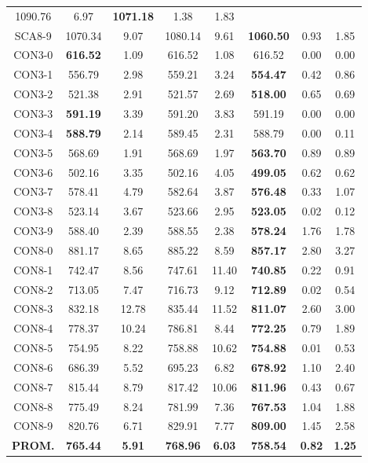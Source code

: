 \begin{table}[h]
\begin{tabular}{c c c c c c c c}
1090.76 & 6.97 & \bf{1071.18} & 
1.38 & 1.83\\SCA8-9 & 1070.34 & 9.07 & 
1080.14 & 9.61 & \bf{1060.50} & 
0.93 & 1.85\\CON3-0 & \bf{616.52} & 1.09 & 
616.52 & 1.08 & 616.52 & 0.00
 & 0.00\\
CON3-1 & 556.79 & 2.98 & 
559.21 & 3.24 & \bf{554.47} & 
0.42 & 0.86\\CON3-2 & 521.38 & 2.91 & 
521.57 & 2.69 & \bf{518.00} & 
0.65 & 0.69\\CON3-3 & \bf{591.19} & 3.39 & 
591.20 & 3.83 & 591.19 & 0.00
 & 0.00\\CON3-4 & \bf{588.79} & 2.14 & 
589.45 & 2.31 & 588.79 & 0.00
 & 0.11\\CON3-5 & 568.69 & 1.91 & 
568.69 & 1.97 & \bf{563.70} & 
0.89 & 0.89\\CON3-6 & 502.16 & 3.35 & 
502.16 & 4.05 & \bf{499.05} & 
0.62 & 0.62\\CON3-7 & 578.41 & 4.79 & 
582.64 & 3.87 & \bf{576.48} & 
0.33 & 1.07\\CON3-8 & 523.14 & 3.67 & 
523.66 & 2.95 & \bf{523.05} & 
0.02 & 0.12\\CON3-9 & 588.40 & 2.39 & 
588.55 & 2.38 & \bf{578.24} & 
1.76 & 1.78\\CON8-0 & 881.17 & 8.65 & 
885.22 & 8.59 & \bf{857.17} & 
2.80 & 3.27\\CON8-1 & 742.47 & 8.56 & 
747.61 & 11.40 & \bf{740.85} & 
0.22 & 0.91\\CON8-2 & 713.05 & 7.47 & 
716.73 & 9.12 & \bf{712.89} & 
0.02 & 0.54\\CON8-3 & 832.18 & 12.78 & 
835.44 & 11.52 & \bf{811.07} & 
2.60 & 3.00\\CON8-4 & 778.37 & 10.24 & 
786.81 & 8.44 & \bf{772.25} & 
0.79 & 1.89\\CON8-5 & 754.95 & 8.22 & 
758.88 & 10.62 & \bf{754.88} & 
0.01 & 0.53\\CON8-6 & 686.39 & 5.52 & 
695.23 & 6.82 & \bf{678.92} & 
1.10 & 2.40\\CON8-7 & 815.44 & 8.79 & 
817.42 & 10.06 & \bf{811.96} & 
0.43 & 0.67\\CON8-8 & 775.49 & 8.24 & 
781.99 & 7.36 & \bf{767.53} & 
1.04 & 1.88\\CON8-9 & 820.76 & 6.71 & 
829.91 & 7.77 & \bf{809.00} & 
1.45 & 2.58\\\bf{PROM.} & 
\bf{765.44} & \bf{5.91} & \bf{768.96} & \bf{6.03} & \bf{758.54} & \bf{0.82} & \bf{1.25}\\[1ex]\hline
\end{tabular}
\label{table:SS-M-50-0.1}
\end{table}

